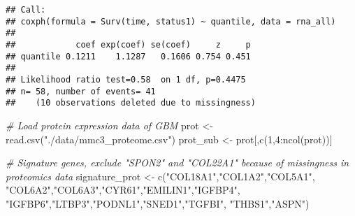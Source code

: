 \documentclass[
]{article}
\newenvironment{Shaded}{\begin{snugshade}}{\end{snugshade}}
\newcommand{\CommentTok}[1]{\textcolor[rgb]{0.56,0.35,0.01}{\textit{#1}}}
\newcommand{\DecValTok}[1]{\textcolor[rgb]{0.00,0.00,0.81}{#1}}
\newcommand{\FunctionTok}[1]{\textcolor[rgb]{0.00,0.00,0.00}{#1}}
\newcommand{\NormalTok}[1]{#1}
\newcommand{\OtherTok}[1]{\textcolor[rgb]{0.56,0.35,0.01}{#1}}
\newcommand{\SpecialCharTok}[1]{\textcolor[rgb]{0.00,0.00,0.00}{#1}}
\newcommand{\StringTok}[1]{\textcolor[rgb]{0.31,0.60,0.02}{#1}}
\begin{document}
\begin{verbatim}
## Call:
## coxph(formula = Surv(time, status1) ~ quantile, data = rna_all)
## 
##            coef exp(coef) se(coef)     z     p
## quantile 0.1211    1.1287   0.1606 0.754 0.451
## 
## Likelihood ratio test=0.58  on 1 df, p=0.4475
## n= 58, number of events= 41 
##    (10 observations deleted due to missingness)
\end{verbatim}

\begin{Shaded}
\begin{Highlighting}[]
\CommentTok{\# Load protein expression data of GBM}
\NormalTok{prot }\OtherTok{\textless{}{-}} \FunctionTok{read.csv}\NormalTok{(}\StringTok{"./data/mmc3\_proteome.csv"}\NormalTok{)}
\NormalTok{prot\_sub }\OtherTok{\textless{}{-}}\NormalTok{ prot[,}\FunctionTok{c}\NormalTok{(}\DecValTok{1}\NormalTok{,}\DecValTok{4}\SpecialCharTok{:}\FunctionTok{ncol}\NormalTok{(prot))]}
\end{Highlighting}
\end{Shaded}

\begin{Shaded}
\begin{Highlighting}[]
\CommentTok{\# Signature genes, exclude "SPON2" and "COL22A1" because of missingness in proteomics data}
\NormalTok{signature\_prot }\OtherTok{\textless{}{-}} \FunctionTok{c}\NormalTok{(}\StringTok{"COL18A1"}\NormalTok{,}\StringTok{"COL1A2"}\NormalTok{,}\StringTok{"COL5A1"}\NormalTok{,}
                    \StringTok{"COL6A2"}\NormalTok{,}\StringTok{"COL6A3"}\NormalTok{,}\StringTok{"CYR61"}\NormalTok{,}\StringTok{"EMILIN1"}\NormalTok{,}\StringTok{"IGFBP4"}\NormalTok{,}
                    \StringTok{"IGFBP6"}\NormalTok{,}\StringTok{"LTBP3"}\NormalTok{,}\StringTok{"PODNL1"}\NormalTok{,}\StringTok{"SNED1"}\NormalTok{,}\StringTok{"TGFBI"}\NormalTok{,}
                    \StringTok{"THBS1"}\NormalTok{,}\StringTok{"ASPN"}\NormalTok{)}
\end{Highlighting}
\end{Shaded}
\end{document}
